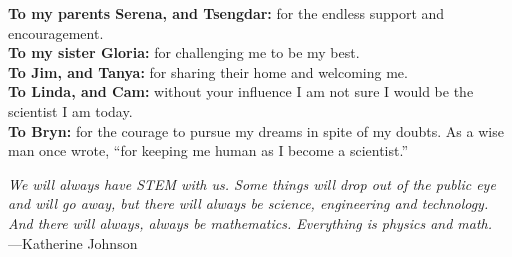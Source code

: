 %
\begin{frontmatter}

%
%
\makefrontmatter

%
%
%
%
%
%



\begin{mydedication} %
  \begin{flushleft}
  \vspace{1cm}
  \textbf{To my parents Serena, and Tsengdar:} for the endless support and encouragement.\\
  \textbf{To my sister Gloria:} for challenging me to be my best.\\[1cm]
  \textbf{To Jim, and Tanya:} for sharing their home and welcoming me.\\[1cm]
  \textbf{To Linda, and Cam:} without your influence I am not sure I would be the scientist I am today.\\[3cm]
  \textbf{To Bryn:} for the courage to pursue my dreams in spite of my doubts. As a wise man once wrote, ``for keeping me human as I become a scientist.''
  \end{flushleft}
\end{mydedication}



%
%
\begin{epigraph} %
  \emph{We will always have STEM with us. Some things will drop out of the public eye and will go away, but there will always be science, engineering and technology. And there will always, always be mathematics. Everything is physics and math.}\\
  ---Katherine Johnson
\end{epigraph}


\end{frontmatter}
